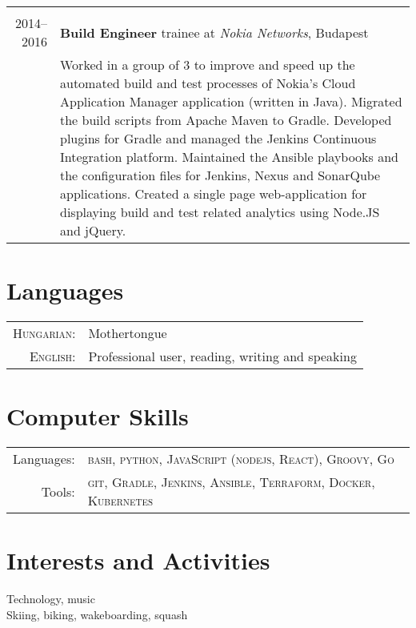 \documentclass[a4paper,10pt]{article} %
\begin{document}
\begin{tabular}{r|p{12.5cm}}
\multicolumn{2}{c}{} \\
\textsc{2014--2016} & \textbf{Build Engineer} trainee at \emph{Nokia Networks}, Budapest \\
& \footnotesize{Worked in a group of 3 to improve and speed up the automated build and test processes of Nokia’s Cloud Application Manager application (written in Java).
Migrated the build scripts from Apache Maven to Gradle. Developed plugins for Gradle and managed the Jenkins Continuous Integration platform. Maintained the Ansible playbooks and the configuration files for Jenkins, Nexus and SonarQube applications. Created a single page web-application for displaying build and test related analytics using Node.JS and jQuery.}\\

\end{tabular}

\section{Languages}
\begin{tabular}{rl}
\textsc{Hungarian:} & Mothertongue\\
\textsc{English:} &  Professional user, reading, writing and speaking\\
\end{tabular}

\section{Computer Skills}
\begin{tabular}{rl}
Languages: & \textsc{bash}, \textsc{python}, \textsc{JavaScript} (\textsc{nodejs, React}), \textsc{Groovy}, \textsc{Go} \\
Tools: &  \textsc{git}, \textsc{Gradle}, \textsc{Jenkins}, \textsc{Ansible}, \textsc{Terraform}, \textsc{Docker}, \textsc{Kubernetes}

\end{tabular}

\section{Interests and Activities}
Technology, music \\
Skiing, biking, wakeboarding, squash
\end{document}
